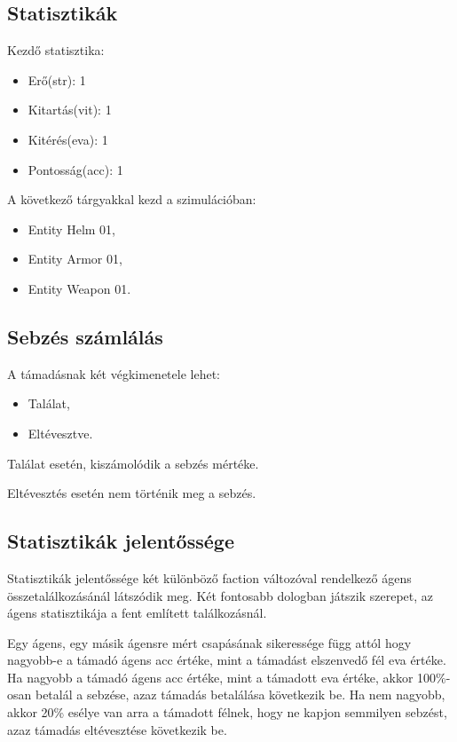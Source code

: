 \subsection{Statisztikák}

\noindent Kezdő statisztika:
\begin{itemize}
    \item Erő(str): 1
    \item Kitartás(vit): 1
    \item Kitérés(eva): 1
    \item Pontosság(acc): 1
\end{itemize}

\noindent A következő tárgyakkal kezd a szimulációban:

\begin{itemize}
    \item Entity Helm 01,
    \item Entity Armor 01,
    \item Entity Weapon 01.
\end{itemize}

\subsection{Sebzés számlálás}

\label{számlálás}

A támadásnak két végkimenetele lehet:

\begin{itemize}
    \item Találat,
    \item Eltévesztve.
\end{itemize}

\noindent Találat esetén, kiszámolódik a sebzés mértéke. 

\noindent Eltévesztés esetén nem történik meg a sebzés. 

\subsection{Statisztikák jelentőssége}

Statisztikák jelentőssége két különböző faction változóval rendelkező ágens összetalálkozásánál látszódik meg.
Két fontosabb dologban játszik szerepet, az ágens statisztikája a fent említett találkozásnál.

Egy ágens, egy másik ágensre mért csapásának sikeressége függ attól hogy nagyobb-e a támadó ágens acc értéke, mint a támadást elszenvedő fél eva értéke.
Ha nagyobb a támadó ágens acc értéke, mint a támadott eva értéke, akkor 100\%-osan betalál a sebzése, azaz támadás betalálása következik be.
Ha nem nagyobb, akkor 20\% esélye van arra a támadott félnek, hogy ne kapjon semmilyen sebzést, azaz támadás eltévesztése következik be.

